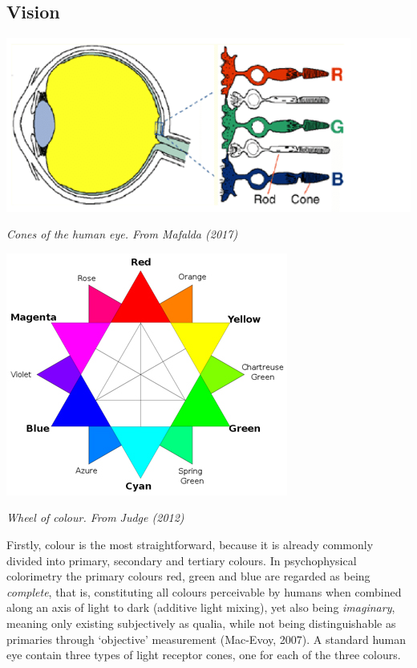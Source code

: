 \subsection{Vision}

\begin{center}
\includegraphics[scale=0.3]{./Images/eyes.jpeg}

{\it \footnotesize Cones of the human eye. From Mafalda (2017)}

\includegraphics[scale=0.4]{./Images/colorwheel.jpg}

{\it \footnotesize Wheel of colour. From Judge (2012)}
\end{center}

\noindent Firstly, colour is the most straightforward, because it is already commonly divided into primary, secondary and tertiary colours. In psychophysical colorimetry the primary colours red, green and blue are regarded as being \textit{complete}, that is, constituting all colours perceivable by humans when combined along an axis of light to dark (additive light mixing), yet also being \textit{imaginary}, meaning only existing subjectively as qualia, while not being distinguishable as primaries through ‘objective’ measurement (Mac-Evoy, 2007). A standard human eye contain three types of light receptor cones, one for each of the three colours. 


